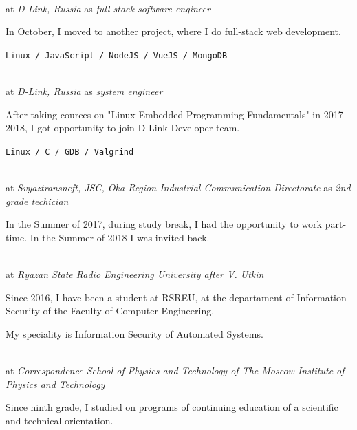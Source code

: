 \Sep


 \\
at \textit{D-Link, Russia}
as \textit{full-stack software engineer}
\SmallSep

In October, I moved to another project, where I do full-stack web development.

\SmallSep

\texttt{Linux / JavaScript / NodeJS / VueJS / MongoDB}

\SmallSep

 \\
at \textit{D-Link, Russia}
as \textit{system engineer}
\SmallSep

After taking cources on "Linux Embedded Programming Fundamentals" in 2017-2018, I got opportunity to join D-Link Developer team.
\SmallSep

\texttt{Linux / C / GDB / Valgrind}

\clearpage
\framebreak
\framebreak

 \\
at \textit{Svyaztransneft, JSC, Oka Region Industrial Communication Directorate}
as \textit{2nd grade techician}
\SmallSep

In the Summer of 2017, during study break, I had the opportunity to work part-time. In the Summer of 2018 I was invited back.

\Sep

 \\
at \textit{Ryazan State Radio Engineering University after V. Utkin}
\SmallSep

Since 2016, I have been a student at RSREU, at the departament of Information Security of the Faculty of Computer Engineering.

My speciality is Information Security of Automated Systems.

\SmallSep

 \\
at \textit{Correspondence School of Physics and Technology of The Moscow Institute of Physics and Technology}
\SmallSep

Since ninth grade, I studied on programs of continuing education of a scientific and technical orientation.

\SmallSep

